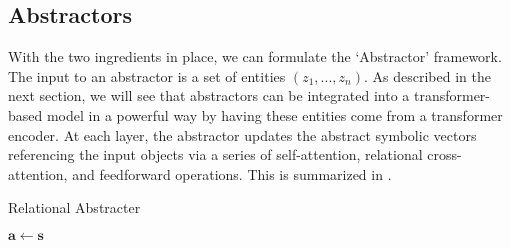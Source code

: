 \subsection{Abstractors}

With the two ingredients in place, we can formulate the `Abstractor' framework. The input to an abstractor is a set of entities $(z_1, ..., z_n)$. As described in the next section, we will see that abstractors can be integrated into a transformer-based model in a powerful way by having these entities come from a transformer encoder. At each layer, the abstractor updates the abstract symbolic vectors referencing the input objects via a series of self-attention, relational cross-attention, and feedforward operations. This is summarized in .

\begin{algorithm}[h!]
    \caption{Relational Abstracter}\label{alg:relational_abstractor}

    \vspace{1em}

    $\boldsymbol{a} \gets \boldsymbol{s}$

\end{algorithm}



% 
